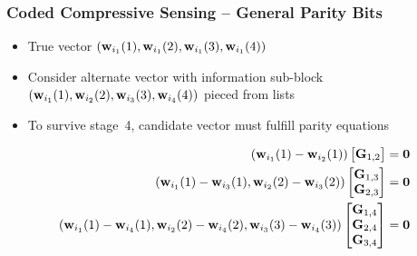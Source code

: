 \begin{frame}
\frametitle{Coded Compressive Sensing -- General Parity Bits}
\begin{center}

\end{center}
\begin{itemize}
\item True vector $(\mathbf{w}_{i_1}(1), \mathbf{w}_{i_1}(2), \mathbf{w}_{i_1}(3), \mathbf{w}_{i_1}(4))$
\item Consider alternate vector with information sub-block $(\mathbf{w}_{i_1}(1), \mathbf{w}_{i_2}(2), \mathbf{w}_{i_3}(3), \mathbf{w}_{i_4}(4))$ pieced from lists
\item To survive stage~4, candidate vector must fulfill parity equations
\end{itemize}
\begin{align*}
\left( \mathbf{w}_{i_1}(1) - \mathbf{w}_{i_2}(1) \right) \begin{bmatrix} \mathbf{G}_{1,2} \end{bmatrix} &= \mathbf{0} \\
\left( \mathbf{w}_{i_1}(1) - \mathbf{w}_{i_3}(1), \mathbf{w}_{i_2}(2) - \mathbf{w}_{i_3}(2) \right)
\begin{bmatrix} \mathbf{G}_{1,3} \\ \mathbf{G}_{2,3} \end{bmatrix}
&= \mathbf{0} \\
\left( \mathbf{w}_{i_1}(1) - \mathbf{w}_{i_4}(1), \mathbf{w}_{i_2}(2) - \mathbf{w}_{i_4}(2), \mathbf{w}_{i_3}(3) - \mathbf{w}_{i_4}(3) \right)
\begin{bmatrix} \mathbf{G}_{1,4} \\ \mathbf{G}_{2,4} \\ \mathbf{G}_{3,4} \end{bmatrix}
&= \mathbf{0}
\end{align*}
\end{frame}


